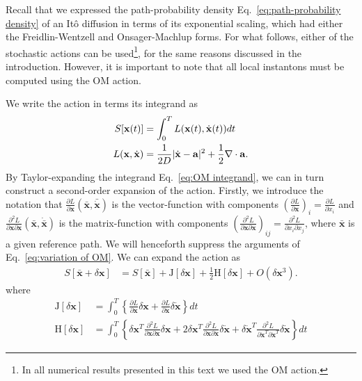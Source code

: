 Recall that we expressed the path-probability density Eq.~\ref{eq:path-probability density} of an It\^{o} diffusion in terms of its exponential scaling, which had either the Freidlin-Wentzell and Onsager-Machlup forms. For what follows, either of the stochastic actions can be used\footnote{In all numerical results presented in this text we used the OM action.}, for the same reasons discussed in the introduction. However, it is important to note that all local instantons must be computed using the OM action.

We write the action in terms its integrand as
\begin{subequations} \label{eq:action to expand}
\begin{align}
S[\mathbf{x}(t)] & =\int_{0}^{T}L(\mathbf{x}(t),\dot{\mathbf{x}}(t))dt\label{eq:onsager-machlup action}\\
L(\mathbf{x},\dot{\mathbf{x}}) & =\frac{1}{2D}|\dot{{\bf x}}-\mathbf{a}|^{2}+\frac{1}{2}\nabla\cdot\mathbf{a}. \label{eq:OM integrand} 
\end{align}
\end{subequations}
By Taylor-expanding the integrand Eq.~\ref{eq:OM integrand}, we can in turn construct a second-order expansion of the action. Firstly, we introduce the notation that $\frac{\partial L}{\partial\mathbf{x}}(\bar{\mathbf{x}}, \bar{\dot{\mathbf{x}}})$ is the vector-function with components $\left(\frac{\partial L}{\partial\mathbf{x}}\right)_i = \frac{\partial L}{\partial x_i}$ and $\frac{\partial^{2}L}{\partial \mathbf{x}\partial\mathbf{x}}(\bar{\mathbf{x}}, \dot{\bar{\mathbf{x}}})$ is the matrix-function with components $\left( \frac{\partial^{2}L}{\partial\mathbf{x}\partial\mathbf{x}} \right)_{ij} =  \frac{\partial^{2}L}{\partial x_i \partial x_j}$, where $\bar{\mathbf{x}}$ is a given reference path. We will henceforth suppress the arguments of Eq.~\ref{eq:variation of OM}. We can expand the action as
\begin{align}
S[\mathbf{\mathbf{\bar{\mathbf{x}}}}+\delta\mathbf{x}] & =S[\mathbf{\mathbf{\bar{\mathbf{x}}}}]+\mathrm{J}[\delta\mathbf{x}]+\frac{1}{2}\mathrm{H}[\delta\mathbf{x}]+O(\delta\mathbf{x}^{3}). \label{eq:variation of OM}
\end{align}
where
\begin{subequations}
	\begin{align}
		\mathrm{J}[\delta\mathbf{x}] & = \int_0^T \left\{
				\frac{\partial L}{\partial \mathbf{x}} \delta \mathbf{x} + \frac{\partial L}{\partial \dot{\mathbf{x}}} \delta \dot{\mathbf{x}} 
			\right\} dt \\
		\mathrm{H}[\delta\mathbf{x}] & = \int_0^T \left\{
				\delta \mathbf{x}^T \frac{\partial^2 L}{\partial \mathbf{x} \partial \mathbf{x}} \delta \mathbf{x} 
				+ 2 \delta \mathbf{x}^T \frac{\partial^2 L}{\partial \mathbf{x} \partial \dot{\mathbf{x}}} \delta \dot{\mathbf{x}}
				+ \delta \dot{\mathbf{x}}^T \frac{\partial^2 L}{\partial \dot{\mathbf{x}}^T \partial \dot{\mathbf{x}}^T} \delta \dot{\mathbf{x}}
			\right\} dt \label{eq:functional H}
	\end{align} 
\end{subequations}
